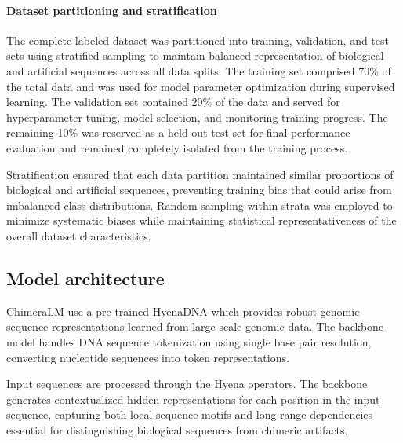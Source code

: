 \documentclass[pdflatex,sn-nature]{sn-jnl}%
\theoremstyle{thmstyleone}%
\theoremstyle{thmstyletwo}%
\theoremstyle{thmstylethree}%
\begin{document}
\paragraph{Dataset partitioning and stratification}
The complete labeled dataset was partitioned into training, validation, and test sets using stratified sampling to maintain balanced representation of biological and artificial sequences across all data splits.
The training set comprised 70\% of the total data and was used for model parameter optimization during supervised learning.
The validation set contained 20\% of the data and served for hyperparameter tuning, model selection, and monitoring training progress.
The remaining 10\% was reserved as a held-out test set for final performance evaluation and remained completely isolated from the training process.

Stratification ensured that each data partition maintained similar proportions of biological and artificial sequences, preventing training bias that could arise from imbalanced class distributions. Random sampling within strata was employed to minimize systematic biases while maintaining statistical representativeness of the overall dataset characteristics.

\subsection*{Model architecture}

ChimeraLM use a pre-trained HyenaDNA which provides robust genomic sequence representations learned from large-scale genomic data.
The backbone model handles DNA sequence tokenization using single base pair resolution, converting nucleotide sequences into token representations.

Input sequences are processed through the Hyena operators.
The backbone generates contextualized hidden representations for each position in the input sequence, capturing both local sequence motifs and long-range dependencies essential for distinguishing biological sequences from chimeric artifacts.
\end{document}
